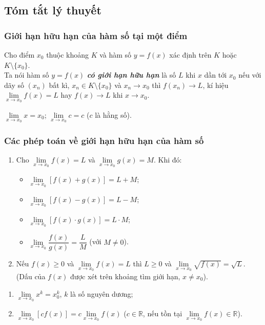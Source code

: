 \subsection{Tóm tắt lý thuyết}
\begin{tomtat}
	\subsubsection{Giới hạn hữu hạn của hàm số tại một điểm}
	
	\begin{dn}
		Cho điểm $ x_0 $ thuộc khoảng $ K $ và hàm số $ y=f(x) $ xác định trên $ K $ hoặc $ K\setminus\{x_0\} $.\\
		Ta nói hàm số $ y=f(x) $ \textbf{\textit{có giới hạn hữu hạn}} là số $ L $ khi $ x $ dần tới $ x_0 $ nếu với dãy số $ (x_n) $ bất kì, $ x_n\in K\setminus\{x_0\} $ và $ x_n \to x_0 $ thì $ f(x_n)\to L $, kí hiệu $ \lim \limits_{x \to x_0} f(x) =L$ hay $ f(x)\to L $ khi $ x\to x_0 $.
	\end{dn}
	
	\begin{note} 
		$ \lim \limits_{x \to x_0} x=x_0 $; \quad $ \lim \limits_{x \to x_0} c=c $ ($ c $ là hằng số).
	\end{note} 
	\subsubsection{Các phép toán về giới hạn hữu hạn của hàm số}
	\begin{enumerate}
		\item Cho $ \lim \limits_{x \to x_0} f(x) =L$ và $ \lim \limits_{x \to x_0} g(x)=M $. Khi đó:
		\begin{itemize}
			\item $ \lim \limits_{x \to x_0} [f(x)+g(x)]=L+M $;
			\item $ \lim \limits_{x \to x_0} [f(x)-g(x)]=L-M $;
			\item $ \lim \limits_{x \to x_0} [f(x)\cdot g(x)]=L\cdot M $;
			\item $ \lim \limits_{x \to x_0} \dfrac{f(x)}{g(x)}=\dfrac{L}{M} $ (với $ M\neq 0 $).			
		\end{itemize}
		\item Nếu $ f(x)\geq 0 $ và $ \lim \limits_{x \to x_0} f(x) =L$ thì $ L\geq 0 $ và $ \lim \limits_{x \to x_0} \sqrt{f(x)}=\sqrt{L} $.\\
		(Dấu của $ f(x) $ được xét trên khoảng tìm giới hạn, $ x\neq x_0 $).
	\end{enumerate}
	\begin{note} 
		\indent
		\begin{enumerate}
			\item $ \lim \limits_{x \to x_0} x^k=x_0^k $, $ k $ là số nguyên dương;
			\item $ \lim \limits_{x \to x_0} [cf(x)]=c\lim \limits_{x \to x_0} f(x) $ ($ c\in \mathbb{R} $, nếu tồn tại $ \lim \limits_{x \to x_0} f(x) \in \mathbb{R}$).
		\end{enumerate}
	\end{note} 
	

\end{tomtat}
